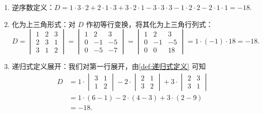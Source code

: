 \begin{solution}
    \begin{enumerate}
        \item 逆序数定义：$D = 1 \cdot 3 \cdot 2 + 2 \cdot 1 \cdot 3 + 3 \cdot 2 \cdot 1 - 3 \cdot 3 \cdot 3 - 1 \cdot 2 \cdot 2 - 2 \cdot 1 \cdot 1 = -18$.
        \item 化为上三角形式：对 $D$ 作初等行变换，将其化为上三角行列式：
            \[
                D = \begin{vmatrix}
                    1 & 2 & 3 \\
                    2 & 3 & 1 \\
                    3 & 1 & 2
                \end{vmatrix} = \begin{vmatrix}
                    1 & 2 & 3 \\
                    0 & -1 & -5 \\
                    0 & -5 & -7
                \end{vmatrix} = \begin{vmatrix}
                    1 & 2 & 3 \\
                    0 & -1 & -5 \\
                    0 & 0 & 18
                \end{vmatrix}
                = 1 \cdot (-1) \cdot 18
                = -18.
            \]

        \item 递归式定义展开：我们对第一行展开，由\autoref{def:递归式定义} 可知
              \begin{align*}
                  D & =1 \cdot
                  \begin{vmatrix}
                      3 & 1 \\
                      1 & 2
                  \end{vmatrix} - 2
                  \cdot \begin{vmatrix}
                            2 & 1 \\
                            3 & 2
                        \end{vmatrix}+3
                  \cdot \begin{vmatrix}
                            2 & 3 \\
                            3 & 1
                        \end{vmatrix}                           \\
                    & =1 \cdot (6-1)-2 \cdot (4-3)+3 \cdot (2-9) \\
                    & =-18.
              \end{align*}
    \end{enumerate}
\end{solution}

